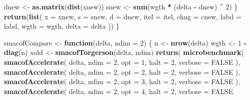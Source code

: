 \documentclass[
  12pt,
]{article}
\newenvironment{Shaded}{\begin{snugshade}}{\end{snugshade}}
\newcommand{\AttributeTok}[1]{\textcolor[rgb]{0.13,0.29,0.53}{#1}}
\newcommand{\ConstantTok}[1]{\textcolor[rgb]{0.56,0.35,0.01}{#1}}
\newcommand{\ControlFlowTok}[1]{\textcolor[rgb]{0.13,0.29,0.53}{\textbf{#1}}}
\newcommand{\DecValTok}[1]{\textcolor[rgb]{0.00,0.00,0.81}{#1}}
\newcommand{\FunctionTok}[1]{\textcolor[rgb]{0.13,0.29,0.53}{\textbf{#1}}}
\newcommand{\NormalTok}[1]{#1}
\newcommand{\OtherTok}[1]{\textcolor[rgb]{0.56,0.35,0.01}{#1}}
\newcommand{\SpecialCharTok}[1]{\textcolor[rgb]{0.81,0.36,0.00}{\textbf{#1}}}
\begin{document}
\begin{Shaded}
\begin{Highlighting}[]
\NormalTok{    dnew }\OtherTok{\textless{}{-}} \FunctionTok{as.matrix}\NormalTok{(}\FunctionTok{dist}\NormalTok{(xnew))}
\NormalTok{    snew }\OtherTok{\textless{}{-}} \FunctionTok{sum}\NormalTok{(wgth }\SpecialCharTok{*}\NormalTok{ (delta }\SpecialCharTok{{-}}\NormalTok{ dnew) }\SpecialCharTok{\^{}} \DecValTok{2}\NormalTok{)}
\NormalTok{  \}}
  \FunctionTok{return}\NormalTok{(}\FunctionTok{list}\NormalTok{(}
    \AttributeTok{x =}\NormalTok{ xnew,}
    \AttributeTok{s =}\NormalTok{ snew,}
    \AttributeTok{d =}\NormalTok{ dnew,}
    \AttributeTok{itel =}\NormalTok{ itel,}
    \AttributeTok{chng =}\NormalTok{ cnew,}
    \AttributeTok{labd =}\NormalTok{ labd,}
    \AttributeTok{wgth =}\NormalTok{ wgth,}
    \AttributeTok{delta =}\NormalTok{ delta}
\NormalTok{  ))}
\NormalTok{\}}

\NormalTok{smacofCompare }\OtherTok{\textless{}{-}} \ControlFlowTok{function}\NormalTok{(delta, }\AttributeTok{ndim =} \DecValTok{2}\NormalTok{) \{}
\NormalTok{  n }\OtherTok{\textless{}{-}} \FunctionTok{nrow}\NormalTok{(delta)}
\NormalTok{  wgth }\OtherTok{\textless{}{-}} \DecValTok{1} \SpecialCharTok{{-}} \FunctionTok{diag}\NormalTok{(n)}
\NormalTok{  xold }\OtherTok{\textless{}{-}} \FunctionTok{smacofTorgerson}\NormalTok{(delta, ndim)}
  \FunctionTok{return}\NormalTok{(}
    \FunctionTok{microbenchmark}\NormalTok{(}
      \FunctionTok{smacofAccelerate}\NormalTok{(}
\NormalTok{        delta,}
        \AttributeTok{ndim =} \DecValTok{2}\NormalTok{,}
        \AttributeTok{opt =} \DecValTok{1}\NormalTok{,}
        \AttributeTok{halt =} \DecValTok{2}\NormalTok{,}
        \AttributeTok{verbose =} \ConstantTok{FALSE}
\NormalTok{      ),}
      \FunctionTok{smacofAccelerate}\NormalTok{(}
\NormalTok{        delta,}
        \AttributeTok{ndim =} \DecValTok{2}\NormalTok{,}
        \AttributeTok{opt =} \DecValTok{2}\NormalTok{,}
        \AttributeTok{halt =} \DecValTok{2}\NormalTok{,}
        \AttributeTok{verbose =} \ConstantTok{FALSE}
\NormalTok{      ),}
      \FunctionTok{smacofAccelerate}\NormalTok{(}
\NormalTok{        delta,}
        \AttributeTok{ndim =} \DecValTok{2}\NormalTok{,}
        \AttributeTok{opt =} \DecValTok{3}\NormalTok{,}
        \AttributeTok{halt =} \DecValTok{2}\NormalTok{,}
        \AttributeTok{verbose =} \ConstantTok{FALSE}
\NormalTok{      ),}
      \FunctionTok{smacofAccelerate}\NormalTok{(}
\NormalTok{        delta,}
        \AttributeTok{ndim =} \DecValTok{2}\NormalTok{,}
        \AttributeTok{opt =} \DecValTok{4}\NormalTok{,}
        \AttributeTok{halt =} \DecValTok{2}\NormalTok{,}
        \AttributeTok{verbose =} \ConstantTok{FALSE}

\end{Highlighting}
\end{Shaded}
\end{document}
